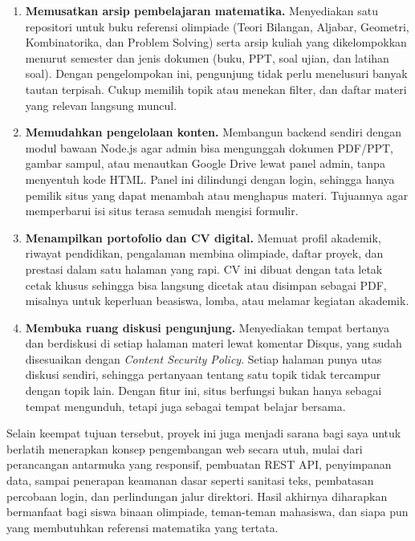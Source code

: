 \documentclass[12pt,a4paper]{article}
\begin{document}
	\begin{enumerate}[leftmargin=*]
		\item \textbf{Memusatkan arsip pembelajaran matematika.} Menyediakan satu repositori untuk buku referensi olimpiade (Teori Bilangan, Aljabar, Geometri, Kombinatorika, dan Problem Solving) serta arsip kuliah yang dikelompokkan menurut semester dan jenis dokumen (buku, PPT, soal ujian, dan latihan soal). Dengan pengelompokan ini, pengunjung tidak perlu menelusuri banyak tautan terpisah. Cukup memilih topik atau menekan filter, dan daftar materi yang relevan langsung muncul.
		\item \textbf{Memudahkan pengelolaan konten.} Membangun backend sendiri dengan modul bawaan Node.js agar admin bisa mengunggah dokumen PDF/PPT, gambar sampul, atau menautkan Google Drive lewat panel admin, tanpa menyentuh kode HTML. Panel ini dilindungi dengan login, sehingga hanya pemilik situs yang dapat menambah atau menghapus materi. Tujuannya agar memperbarui isi situs terasa semudah mengisi formulir.
		\item \textbf{Menampilkan portofolio dan CV digital.} Memuat profil akademik, riwayat pendidikan, pengalaman membina olimpiade, daftar proyek, dan prestasi dalam satu halaman yang rapi. CV ini dibuat dengan tata letak cetak khusus sehingga bisa langsung dicetak atau disimpan sebagai PDF, misalnya untuk keperluan beasiswa, lomba, atau melamar kegiatan akademik.
		\item \textbf{Membuka ruang diskusi pengunjung.} Menyediakan tempat bertanya dan berdiskusi di setiap halaman materi lewat komentar Disqus, yang sudah disesuaikan dengan \textit{Content Security Policy}. Setiap halaman punya utas diskusi sendiri, sehingga pertanyaan tentang satu topik tidak tercampur dengan topik lain. Dengan fitur ini, situs berfungsi bukan hanya sebagai tempat mengunduh, tetapi juga sebagai tempat belajar bersama.
	\end{enumerate}
	
	Selain keempat tujuan tersebut, proyek ini juga menjadi sarana bagi saya untuk berlatih menerapkan konsep pengembangan web secara utuh, mulai dari perancangan antarmuka yang responsif, pembuatan REST API, penyimpanan data, sampai penerapan keamanan dasar seperti sanitasi teks, pembatasan percobaan login, dan perlindungan jalur direktori. Hasil akhirnya diharapkan bermanfaat bagi siswa binaan olimpiade, teman-teman mahasiswa, dan siapa pun yang membutuhkan referensi matematika yang tertata.
	
\end{document}
